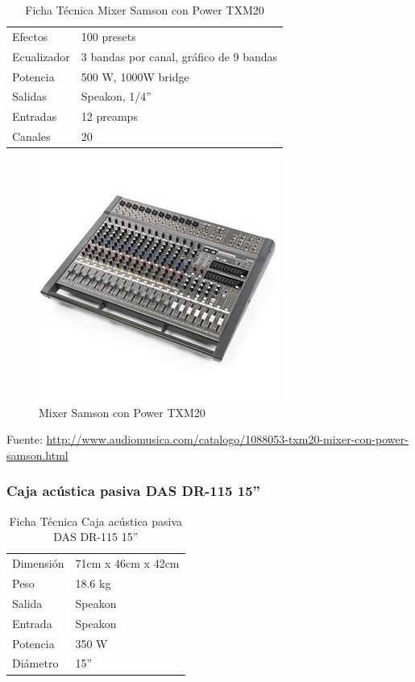 \begin{table}[htb!]
\centering
\begin{tabular}{|l|l|}
\hline
Efectos & 100 presets\\
Ecualizador & 3 bandas por canal, gráfico de 9 bandas\\
Potencia & 500 W, 1000W bridge\\
Salidas & Speakon, 1/4''\\
Entradas & 12 preamps\\
Canales & 20\\
\hline
\end{tabular}
\caption{Ficha Técnica Mixer Samson con Power TXM20}
\end{table}

\begin{figure}[h!t]
   \centering
  \includegraphics[scale=0.3]{img/mixer.jpg}
   \caption{Mixer Samson con Power TXM20}
   \label{fig:mixer}
\end{figure}

Fuente: \url{http://www.audiomusica.com/catalogo/1088053-txm20-mixer-con-power-samson.html}

\subsubsection*{Caja acústica pasiva DAS DR-115 15''}

\begin{table}[htb!]
\centering
\begin{tabular}{|l|l|}
\hline
Dimensión & 71cm x 46cm x 42cm\\
Peso & 18.6 kg\\
Salida & Speakon\\
Entrada & Speakon \\
Potencia & 350 W \\
Diámetro & 15'' \\
\hline
\end{tabular}
\caption{Ficha Técnica Caja acústica pasiva DAS DR-115 15''}
\end{table}

